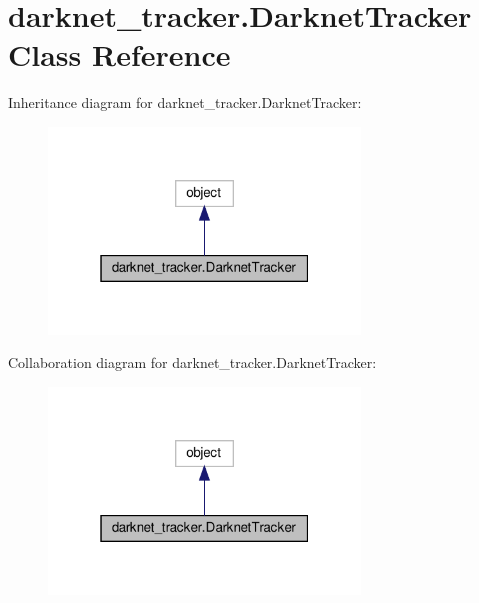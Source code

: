 \hypertarget{classdarknet__tracker_1_1DarknetTracker}{}\section{darknet\+\_\+tracker.\+Darknet\+Tracker Class Reference}
\label{classdarknet__tracker_1_1DarknetTracker}


Inheritance diagram for darknet\+\_\+tracker.\+Darknet\+Tracker\+:
\nopagebreak
\begin{figure}[H]
\begin{center}
\leavevmode
\includegraphics[width=235pt]{classdarknet__tracker_1_1DarknetTracker__inherit__graph}
\end{center}
\end{figure}


Collaboration diagram for darknet\+\_\+tracker.\+Darknet\+Tracker\+:
\nopagebreak
\begin{figure}[H]
\begin{center}
\leavevmode
\includegraphics[width=235pt]{classdarknet__tracker_1_1DarknetTracker__coll__graph}
\end{center}
\end{figure}
